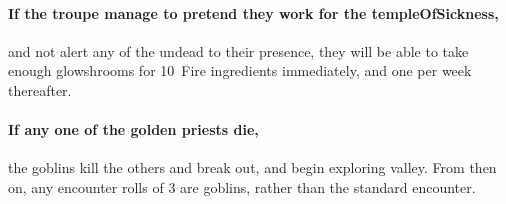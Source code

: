 \begin{multicols}{2}
\bigLine

\paragraph{If the troupe manage to pretend they work for the \gls{templeOfSickness},}
and not alert any of the undead to their presence, they will be able to take enough glowshrooms for 10~Fire \glspl{ingredient} immediately, and one per week thereafter.

\paragraph{If any one of the golden priests die,}
the goblins kill the others and break out, and begin exploring \gls{valley}.
From then on, any encounter rolls of 3 are goblins, rather than the standard encounter.%

\end{multicols}
